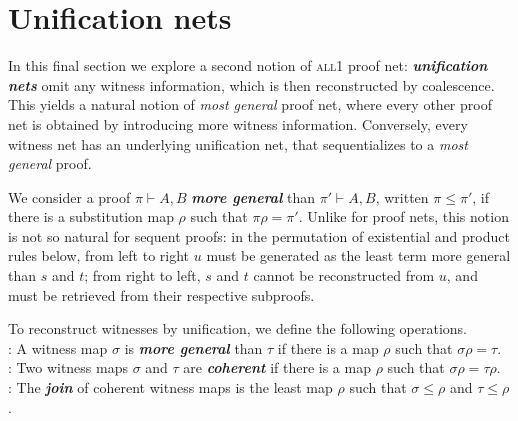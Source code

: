 \documentclass[UKenglish]{lipics-v2019}
\makeatletter
\newcommand\defn[1]{\textit{\textbf{#1}}}
\newcommand\all{\textsc{all}}
\newcommand\+{+}
\renewcommand\*{\times}
\newcommand\seq[2]{{\vdash}#1,#2}
\newcommand\prf[3]{#1\vdash\!#2,#3}
\newcommand\gen{\leq}
\newcommand\coh{\smallfrown}
\newcommand\join{\vee}
\newcommand\Qrr{\!\!\scriptstyle\qrr}
\newcommand\qrr[1]{
  \ifx#1+\expandafter\@qrr\else
  \ifx#1*\*\mathrm R\else
  \ifx#1!\forall\mathrm R\else
  \ifx#1?\expandafter\@@qrr\else
  \ifx#11\mathrm{ax}\else
  \ifx#1.\mathrm{cut}\else
  #1\mathrm R
  \fi\fi\fi\fi\fi\fi
}
\newcommand\@qrr[1]{+\mathrm R,#1}
\newcommand\@@qrr[1]{\exists\mathrm R,#1}
\makeatother
\begin{document}

\section{Unification nets}

In this final section we explore a second notion of \all1 proof net: \defn{unification nets} omit any witness information, which is then reconstructed by coalescence. This yields a natural notion of \emph{most general} proof net, where every other proof net is obtained by introducing more witness information. Conversely, every witness net has an underlying unification net, that sequentializes to a \emph{most general} proof.

We consider a proof $\prf\pi AB$ \defn{more general} than $\prf{\pi'}AB$, written $\pi\leq\pi'$, if there is a substitution map $\rho$ such that $\pi\rho=\pi'$. Unlike for proof nets, this notion is not so natural for sequent proofs: in the permutation of existential and product rules below, from left to right $u$ must be generated as the least term more general than $s$ and $t$; from right to left, $s$ and $t$ cannot be reconstructed from $u$, and must be retrieved from their respective subproofs.

\noindent
To reconstruct witnesses by unification, we define the following operations.
\\
\makebox[28pt][l]{$\sigma\gen\tau$}:\quad
	A witness map $\sigma$ is \defn{more general} than $\tau$ if there is a map $\rho$ such that $\sigma\rho=\tau$.
\\
\makebox[28pt][l]{$\sigma\coh\tau$}:\quad
	Two witness maps $\sigma$ and $\tau$ are \defn{coherent} if there is a map $\rho$ such that $\sigma\rho=\tau\rho$.
\\
\makebox[28pt][l]{$\sigma\join\tau$}:\quad
	The \defn{join} of coherent witness maps is the least map $\rho$ such that $\sigma\gen\rho$ and $\tau\gen\rho$.
\end{document}
